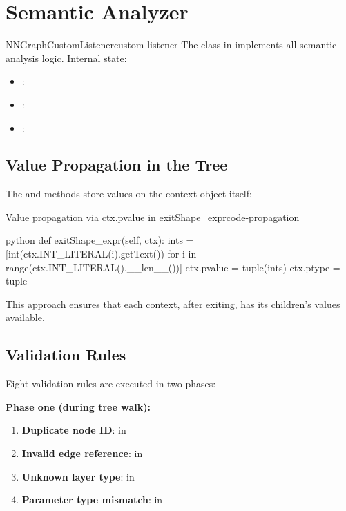 \documentclass{nngraph-en}
\begin{document}
\section{Semantic Analyzer}

\begin{dfnbox}{NNGraphCustomListener}{custom-listener}
The class  in
 implements all semantic analysis logic.
Internal state:
\begin{itemize}[noitemsep]
    \item {}: 
    \item {}: 
    \item {}: 
\end{itemize}
\end{dfnbox}

\subsection{Value Propagation in the Tree}

The  and  methods store values
on the context object itself:

\begin{codebox}{Value propagation via ctx.pvalue in exitShape\_expr}{code-propagation}
\begin{amzcode}{python}
def exitShape_expr(self, ctx):
    ints = [int(ctx.INT_LITERAL(i).getText())
            for i in range(ctx.INT_LITERAL().__len__())]
    ctx.pvalue = tuple(ints)
    ctx.ptype  = tuple
\end{amzcode}
\end{codebox}

This approach ensures that each context, after exiting, has its
children's values available.

\subsection{Validation Rules}

Eight validation rules are executed in two phases:

\textbf{Phase one (during tree walk):}
\begin{enumerate}
    \item \textbf{Duplicate node ID}: in 
    \item \textbf{Invalid edge reference}: in 
    \item \textbf{Unknown layer type}: in 
    \item \textbf{Parameter type mismatch}: in 
\end{enumerate}
\end{document}
